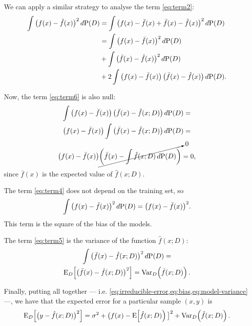We can apply a similar strategy to analyse the term \eqref{eq:term2}:
\begin{align}
  \notag \int \big( f(x) - \hat{f}(x) \big)^2\, d\!\operatorname{P}(D)
    &= \int \big( f(x) - \bar{f}(x) + \bar{f}(x) - \hat{f}(x) \big)^2\, d\!\operatorname{P}(D) \\
    &= \label{eq:term4}\int \big( f(x) - \bar{f}(x) \big)^2\, d\!\operatorname{P}(D) \\
    &+ \label{eq:term5}\int \big( \bar{f}(x) - \hat{f}(x) \big)^2\, d\!\operatorname{P}(D) \\
    &+ \label{eq:term6}2 \int \big( f(x) - \bar{f}(x) \big)\,\big( \bar{f}(x) - \hat{f}(x) \big)\, d\!\operatorname{P}(D)\text{.}
\end{align}

Now, the term \eqref{eq:term6} is also null:
\begin{multline*}
  \int \big( f(x) - \bar{f}(x) \big)\,\big( \bar{f}(x) - \hat{f}(x; D) \big)\, d\!\operatorname{P}(D) = \\
  \big( f(x) - \bar{f}(x) \big) \int \big( \bar{f}(x) - \hat{f}(x; D) \big)\, d\!\operatorname{P}(D) = \\
  \big( f(x) - \bar{f}(x) \big) \cancelto{0}{\left( \bar{f}(x) - \int \hat{f}(x; D)\, d\!\operatorname{P}(D) \right)} = 0\text{,}
\end{multline*}
since $\bar{f}(x)$ is the expected value of $\hat{f}(x; D)$.

The term \eqref{eq:term4} does not depend on the training set, so
\begin{equation}
  \label{eq:bias}
  \int \big( f(x) - \bar{f}(x) \big)^2\, d\!\operatorname{P}(D) =
  \big( f(x) - \bar{f}(x) \big)^2\text{.}
\end{equation}
This term is the square of the bias of the models.

The term \eqref{eq:term5} is the variance of the function $\hat{f}(x; D)$:
\begin{multline}
  \label{eq:model-variance}
  \int \big( \bar{f}(x) - \hat{f}(x; D) \big)^2\, d\!\operatorname{P}(D) =\\
  \operatorname{E}_D\!\left[ \big( \bar{f}(x) - \hat{f}(x; D) \big)^2 \right] =
  \operatorname{Var}_D\!\left( \hat{f}(x; D) \right)\text{.}
\end{multline}

Finally, putting all together --- i.e.  \cref{eq:irreducible-error,eq:bias,eq:model-variance}
---, we have that the expected error for a particular sample $(x, y)$ is
\[
  \operatorname{E}_D\!\left[ \big( y - \hat{f}(x; D) \big)^2 \right] =
    \sigma^2 +
    \big( f(x) - \operatorname{E}\!\left[ \hat{f}(x; D) \right) \big]^2 +
    \operatorname{Var}_D\!\left( \hat{f}(x; D) \right)\text{.}
\]

